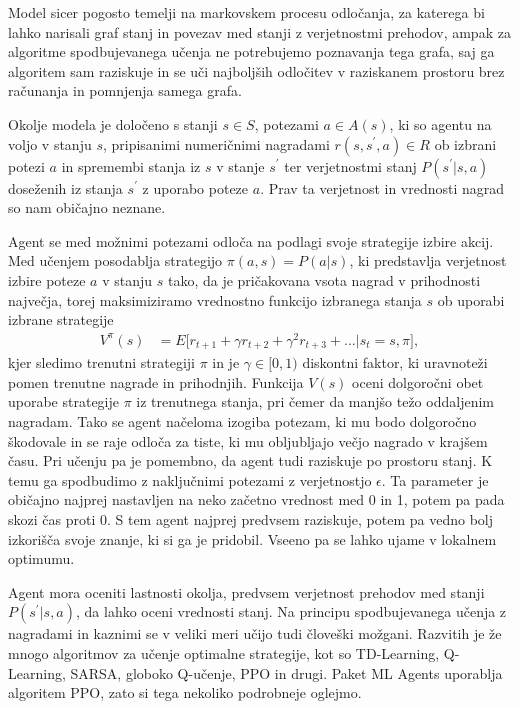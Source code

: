Model sicer pogosto temelji na markovskem procesu odločanja, za katerega bi lahko narisali graf stanj in povezav med stanji z verjetnostmi prehodov, ampak za algoritme spodbujevanega učenja ne potrebujemo poznavanja tega grafa, saj ga algoritem sam raziskuje in se uči najboljših odločitev v raziskanem prostoru brez računanja in pomnjenja samega grafa.

Okolje modela je določeno s stanji $s \in S$, potezami $a\in A(s)$, ki so agentu na voljo v stanju $s$, pripisanimi numeričnimi nagradami $r(s, s^\prime, a) \in R$ ob izbrani potezi $a$ in spremembi stanja iz $s$ v stanje $s^\prime$ ter verjetnostmi stanj $P(s^\prime \vert s, a)$ doseženih iz stanja $s^\prime$ z uporabo poteze $a$. Prav ta verjetnost in vrednosti nagrad so nam običajno neznane.

Agent se med možnimi potezami odloča na podlagi svoje strategije izbire akcij. Med učenjem posodablja strategijo $\pi(a, s)=P(a\vert s)$, ki predstavlja verjetnost izbire poteze $a$ v stanju $s$ tako, da je pričakovana vsota nagrad v prihodnosti največja, torej maksimiziramo vrednostno funkcijo izbranega stanja $s$ ob uporabi izbrane strategije
\begin{align}
V^\pi(s) &= E\lbrack r_{t+1} + \gamma r_{t+2} + \gamma^2r_{t+3} + \ldots\vert s_t=s, \pi\rbrack, \label{eq:value}
\end{align}
kjer sledimo trenutni strategiji $\pi$ in je $\gamma\in\lbrack 0, 1)$ diskontni faktor, ki uravnoteži pomen trenutne nagrade in prihodnjih. Funkcija $V(s)$ oceni dolgoročni obet uporabe strategije $\pi$ iz trenutnega stanja, pri čemer da manjšo težo oddaljenim nagradam. Tako se agent načeloma izogiba potezam, ki mu bodo dolgoročno škodovale in se raje odloča za tiste, ki mu obljubljajo večjo nagrado v krajšem času. Pri učenju pa je pomembno, da agent tudi raziskuje po prostoru stanj. K temu ga spodbudimo z naključnimi potezami z verjetnostjo $\epsilon$. Ta parameter je običajno najprej nastavljen na neko začetno vrednost med 0 in 1, potem pa pada skozi čas proti 0. S tem agent najprej predvsem raziskuje, potem pa vedno bolj izkorišča svoje znanje, ki si ga je pridobil. Vseeno pa se lahko ujame v lokalnem optimumu.

Agent mora oceniti lastnosti okolja, predvsem verjetnost prehodov med stanji $P(s^\prime\vert s, a)$, da lahko oceni vrednosti stanj. Na principu spodbujevanega učenja z nagradami in kaznimi se v veliki meri učijo tudi človeški možgani. Razvitih je že mnogo algoritmov za učenje optimalne strategije, kot so TD-Learning, Q-Learning, SARSA, globoko Q-učenje, PPO in drugi. Paket ML Agents uporablja algoritem PPO, zato si tega nekoliko podrobneje oglejmo.


